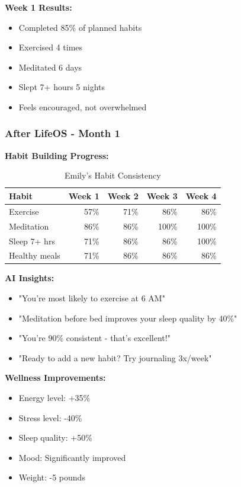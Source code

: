 \textbf{Week 1 Results:}
\begin{itemize}
    \item Completed 85\% of planned habits
    \item Exercised 4 times
    \item Meditated 6 days
    \item Slept 7+ hours 5 nights
    \item Feels encouraged, not overwhelmed
\end{itemize}

\subsubsection{After LifeOS - Month 1}

\textbf{Habit Building Progress:}

\begin{table}[H]
\centering
\caption{Emily's Habit Consistency}
\begin{tabular}{|l|r|r|r|r|}
\hline
\rowcolor{lightgray}
\textbf{Habit} & \textbf{Week 1} & \textbf{Week 2} & \textbf{Week 3} & \textbf{Week 4} \\
\hline
Exercise & 57\% & 71\% & 86\% & 86\% \\
\hline
Meditation & 86\% & 86\% & 100\% & 100\% \\
\hline
Sleep 7+ hrs & 71\% & 86\% & 86\% & 100\% \\
\hline
Healthy meals & 71\% & 86\% & 86\% & 86\% \\
\hline
\end{tabular}
\end{table}

\textbf{AI Insights:}
\begin{itemize}
    \item "You're most likely to exercise at 6 AM"
    \item "Meditation before bed improves your sleep quality by 40\%"
    \item "You're 90\% consistent - that's excellent!"
    \item "Ready to add a new habit? Try journaling 3x/week"
\end{itemize}

\textbf{Wellness Improvements:}
\begin{itemize}
    \item Energy level: +35\%
    \item Stress level: -40\%
    \item Sleep quality: +50\%
    \item Mood: Significantly improved
    \item Weight: -5 pounds
\end{itemize}

